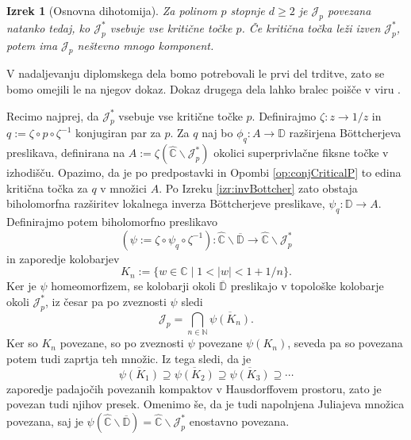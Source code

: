\documentclass[12pt,a4paper]{amsart}
\theoremstyle{definition} %
\theoremstyle{plain} %
\newtheorem{izrek}[definicija]{Izrek}
\newcommand{\N}{\mathbb N}
\newcommand{\CC}{\mathbb C}
\newcommand{\CCinf} {\hat{\CC}} %
\newcommand{\D}{\mathbb D} %
\newcommand{\J}{\mathscr J} %
\begin{document}
\begin{izrek}[Osnovna dihotomija]\label{izr:FundamentalDichotomy}
Za polinom $p$ stopnje $d\geq2$ je $\J_p$ povezana natanko tedaj, ko $\J^\ast_p$ vsebuje vse kritične točke $p$.
Če kritična točka leži izven $\J_p^\ast$, potem ima $\J_p$ neštevno mnogo komponent.
\end{izrek}

\proof
V nadaljevanju diplomskega dela bomo potrebovali le prvi del trditve,
zato se bomo omejili le na njegov dokaz.
Dokaz drugega dela lahko bralec poišče v viru \cite[Stran~99-100]{milnor}.

Recimo najprej, da $\J_p^\ast$ vsebuje vse kritične točke $p$.
Definirajmo $\zeta \colon z \to 1/z$ in $q := \zeta \circ p \circ \zeta^{-1}$ konjugiran par za $p$.
Za $q$ naj bo $\phi_q \colon A \to \D$ razširjena B{\"o}ttcherjeva preslikava,
definirana na $A := \zeta(\CCinf \smallsetminus \J_p^\ast)$ okolici superprivlačne fiksne točke v izhodišču.
Opazimo, da je po predpostavki in Opombi \ref{op:conjCriticalP} to edina kritična točka za $q$ v množici $A$.
Po Izreku \ref{izr:invBottcher} zato obstaja biholomorfna razširitev lokalnega inverza B{\"o}ttcherjeve preslikave, 
$\psi_q \colon \D \to A$. Definirajmo potem biholomorfno preslikavo
$$\left(\psi := \zeta \circ \psi_q \circ \zeta^{-1} \right) \colon \CCinf \smallsetminus \overline{\D} \to \CCinf \smallsetminus \J_p^\ast$$
in zaporedje kolobarjev
$$K_n := \{w \in \CC \mid 1 < |w| < 1 + 1/n\}.$$
Ker je $\psi$ homeomorfizem, se kolobarji okoli $\overline{\D}$ preslikajo v topološke kolobarje okoli $\J_p^\ast$, 
iz česar pa po zveznosti $\psi$ sledi
$$\J_p = \bigcap_{n\in\N} \overline{\psi\left(K_n\right)}.$$
Ker so $K_n$ povezane, so po zveznosti $\psi$ povezane $\psi(K_n)$,
seveda pa so povezana potem tudi zaprtja teh množic.
Iz tega sledi, da je
$$\overline{\psi\left(K_1\right)} \supseteq \overline{\psi\left(K_2\right)} 
\supseteq \overline{\psi\left(K_3\right)} \supseteq \cdots$$
zaporedje padajočih povezanih kompaktov v Hausdorffovem prostoru, zato je povezan tudi njihov presek.
Omenimo še, da je tudi napolnjena Juliajeva množica povezana, 
saj je $\psi(\CCinf \smallsetminus \overline{\D}) = \CCinf \smallsetminus \J_{p}^\ast$ enostavno povezana.
\end{document}
